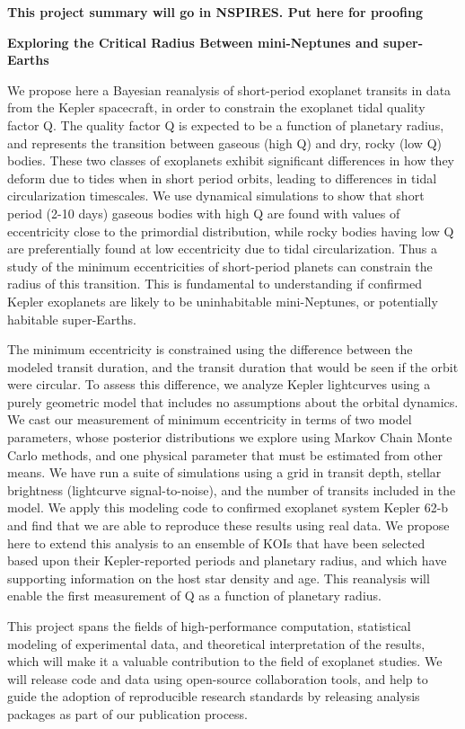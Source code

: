 \centerline{\bf This project summary will go in NSPIRES.  Put here for proofing} \medskip

\centerline{\bf Exploring the Critical Radius Between mini-Neptunes and super-Earths} \medskip

We propose here a Bayesian reanalysis of short-period exoplanet transits in data from the Kepler spacecraft, in order to constrain the exoplanet tidal quality factor Q.  The quality factor Q is expected to be a function of planetary radius, and represents the transition between gaseous (high Q) and dry, rocky (low Q) bodies.  These two classes of exoplanets exhibit significant differences in how they deform due to tides when in short period orbits, leading to differences in tidal circularization timescales.  We use dynamical simulations to show that short period (2-10 days) gaseous bodies with high Q are found with values of eccentricity close to the primordial distribution, while rocky bodies having low Q are preferentially found at low eccentricity due to tidal circularization.  Thus a study of the minimum eccentricities of short-period planets can constrain the radius of this transition.  This is fundamental to understanding if confirmed Kepler exoplanets are likely to be uninhabitable mini-Neptunes, or potentially habitable super-Earths.

The minimum eccentricity is constrained using the difference between the modeled transit duration, and the transit duration that would be seen if the orbit were circular.  To assess this difference, we analyze Kepler lightcurves using a purely geometric model that includes no assumptions about the orbital dynamics.  We cast our measurement of minimum eccentricity in terms of two model parameters, whose posterior distributions we explore using Markov Chain Monte Carlo methods, and one physical parameter that must be estimated from other means.  We have run a suite of simulations using a grid in transit depth, stellar brightness (lightcurve signal-to-noise), and the number of transits included in the model.
%
%
We apply this modeling code to confirmed exoplanet system Kepler 62-b and find that we are able to reproduce these results using real data. We propose here to extend this analysis to an ensemble of KOIs that have been selected based upon their Kepler-reported periods and planetary radius, and which have supporting information on the host star density and age.  This reanalysis will enable the first measurement of Q as a function of planetary radius.

This project spans the fields of high-performance computation, statistical modeling of experimental data, and theoretical interpretation of the results, which will make it a valuable contribution to the field of exoplanet studies.  We will release code and data using open-source collaboration tools, and help to guide the adoption of reproducible research standards by releasing analysis packages as part of our publication process.

